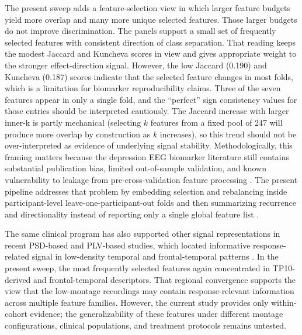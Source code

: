 The present sweep adds a feature-selection view in which larger feature budgets yield more overlap and many more unique selected features. Those larger budgets do not improve discrimination. The panels support a small set of frequently selected features with consistent direction of class separation. That reading keeps the modest Jaccard and Kuncheva scores in view and gives appropriate weight to the stronger effect-direction signal. However, the low Jaccard (0.190) and Kuncheva (0.187) scores indicate that the selected feature changes in most folds, which is a limitation for biomarker reproducibility claims. Three of the seven features appear in only a single fold, and the ``perfect'' sign consistency values for those entries should be interpreted cautiously. The Jaccard increase with larger inner-k is partly mechanical (selecting $k$ features from a fixed pool of 247 will produce more overlap by construction as $k$ increases), so this trend should not be over-interpreted as evidence of underlying signal stability. Methodologically, this framing matters because the depression EEG biomarker literature still contains substantial publication bias, limited out-of-sample validation, and known vulnerability to leakage from pre-cross-validation feature processing \citep{Widge2019,Shim2021}. The present pipeline addresses that problem by embedding selection and rebalancing inside participant-level leave-one-participant-out folds and then summarizing recurrence and directionality instead of reporting only a single global feature list \citep{Shen2025}.

The same clinical program has also supported other signal representations in recent PSD-based and PLV-based studies, which located informative response-related signal in low-density temporal and frontal-temporal patterns \citep{Moncy2024,Xiao2025PMIP}. In the present sweep, the most frequently selected features again concentrated in TP10-derived and frontal-temporal descriptors. That regional convergence supports the view that the low-montage recordings may contain response-relevant information across multiple feature families. However, the current study provides only within-cohort evidence; the generalizability of these features under different montage configurations, clinical populations, and treatment protocols remains untested.


